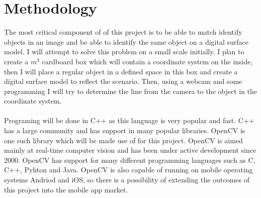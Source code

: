 

\section{Methodology}

The most critical component of of this project is to be able to match identify objects in an image and be able to identify the same object on a digital surface model. I will attempt to solve this problem on a small scale initially. I plan to create a $m^3$ cardboard box which will contain a coordinate system on the inside, then I will place a regular object in a defined space in this box and create a digital surface model to reflect the scenario. Then, using a webcam and some programming I will try to determine the line from the camera to the object in the coordinate system.

\paragraph{}
Programing will be done in C++ as this language is very popular and fast. C++ has a large community and has support in many popular libraries. OpenCV is one such library which will be made use of for this project. OpenCV is aimed mainly at real-time computer vision and has been under active development since 2000. OpenCV has support for many different programming languages such as C, C++, Pyhton and Java. OpenCV is also capable of running on mobile operating systems Andriod and iOS, so there is a possibility of extending the outcomes of this project into the mobile app market.
